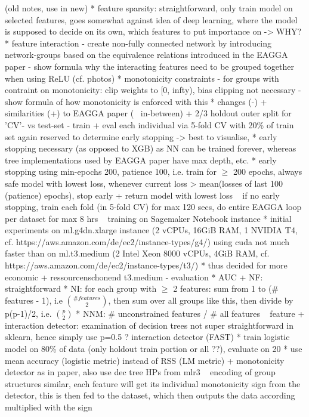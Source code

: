 \documentclass[twoside,11pt]{article}
\begin{document}
  
  (old notes, use in new)
  * feature sparsity: straightforward, only train model on selected features, goes somewhat against idea of deep learning,
    where the model is supposed to decide on its own, which features to put importance on -> WHY?
  * feature interaction
    - create non-fully connected network by introducing network-groups based on the equivalence relations introduced in the EAGGA paper
    - show formula why the interacting features need to be grouped together when using ReLU (cf. photos)
  * monotonicity constraints
    - for groups with contraint on monotonicity: clip weights to [0, infty), bias clipping not necessary
    - show formula of how monotonicity is enforced with this
  * changes (-) + similarities (+) to EAGGA paper (~ in-between)
    + 2/3 holdout outer split for 'CV'- vs test-set
    - train + eval each individual via 5-fold CV with 20\% of train set again reserved to determine early stopping -> best to visualise,
      * early stopping necessary (as opposed to XGB) as NN can be trained forever, whereas tree implementations used by EAGGA paper have
        max depth, etc.
      * early stopping using min-epochs 200, patience 100, i.e. train for $\ge$ 200 epochs, always safe model with lowest loss, whenever
        current loss > mean(losses of last 100 (patience) epochs), stop early + return model with lowest loss
    ~ if no early stopping, train each fold (in 5-fold CV) for max 120 secs, do entire EAGGA loop per dataset for max 8 hrs
    ~ training on Sagemaker Notebook instance
      * initial experiments on ml.g4dn.xlarge instance (2 vCPUs, 16GiB RAM, 1 NVIDIA T4, cf. https://aws.amazon.com/de/ec2/instance-types/g4/)
      using cuda not much faster than on ml.t3.medium (2 Intel Xeon 8000 vCPUs, 4GiB RAM, cf. https://aws.amazon.com/de/ec2/instance-types/t3/)
      * thus decided for more economic + ressourcenschonend t3.medium
    - evaluation
      * AUC + NF: straightforward
      * NI: for each group with $\ge$ 2 features: sum from 1 to (\# features - 1), i.e ${\# features \choose 2}$,
        then sum over all groups like this, then divide by p(p-1)/2, i.e. ${p \choose 2}$
      * NNM: \# unconstrained features / \# all features
    ~ feature + interaction detector: examination of decision trees not super straightforward in sklearn, hence simply use p=0.5
    ? interaction detector (FAST)
      * train logistic model on 80\% of data (only holdout train portion or all ??), evaluate on 20
      * use mean accuracy (logistic metric) instead of RSS (LM metric)
    + monotonicity detector as in paper, also use dec tree HPs from mlr3
    ~ encoding of group structures similar, each feature will get its individual monotonicity sign from the detector, this is then fed to the dataset,
      which then outputs the data according multiplied with the sign
\end{document}
